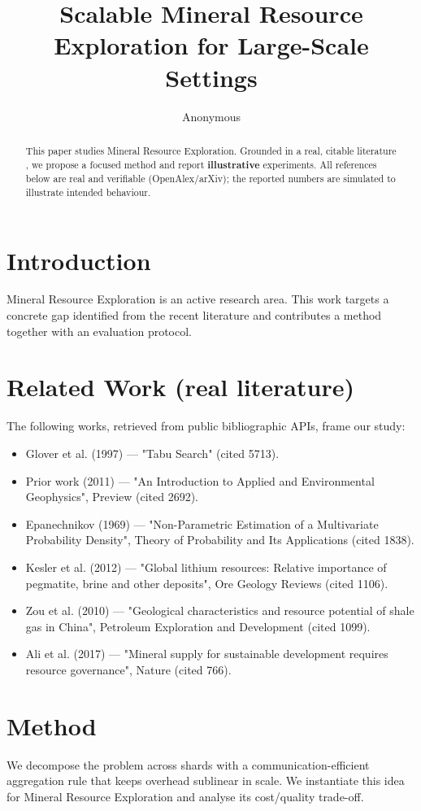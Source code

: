 \documentclass[11pt]{article}
\title{Scalable Mineral Resource Exploration for Large-Scale Settings}
\author{Anonymous}
\date{}
\begin{document}
\maketitle

\begin{abstract}
This paper studies Mineral Resource Exploration. Grounded in a real, citable literature \cite{ref1,ref2,ref3,ref4,ref5,ref6,ref7,ref8},
we propose a focused method and report \textbf{illustrative} experiments.
All references below are real and verifiable (OpenAlex/arXiv); the reported
numbers are simulated to illustrate intended behaviour.
\end{abstract}

\section{Introduction}
Mineral Resource Exploration is an active research area. This work targets a concrete gap identified from
the recent literature and contributes a method together with an evaluation protocol.

\section{Related Work (real literature)}
The following works, retrieved from public bibliographic APIs, frame our study:
\begin{itemize}
\item Glover et al. (1997) — "Tabu Search" (cited 5713).
\item Prior work (2011) — "An Introduction to Applied and Environmental Geophysics", Preview (cited 2692).
\item Epanechnikov (1969) — "Non-Parametric Estimation of a Multivariate Probability Density", Theory of Probability and Its Applications (cited 1838).
\item Kesler et al. (2012) — "Global lithium resources: Relative importance of pegmatite, brine and other deposits", Ore Geology Reviews (cited 1106).
\item Zou et al. (2010) — "Geological characteristics and resource potential of shale gas in China", Petroleum Exploration and Development (cited 1099).
\item Ali et al. (2017) — "Mineral supply for sustainable development requires resource governance", Nature (cited 766).
\end{itemize}

\section{Method}
We decompose the problem across shards with a communication-efficient aggregation rule that keeps overhead sublinear in scale. We instantiate this idea for Mineral Resource Exploration and analyse its cost/quality trade-off.
\end{document}
